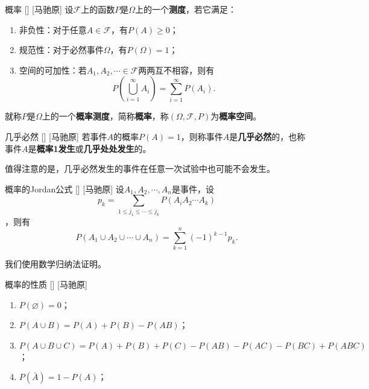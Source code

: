 \documentclass[UTF8]{ctexart}
\begin{document}
        \begin{dfn}
            []
            {概率}
            []
            [马驰原]
            设$\mathcal{F}$上的函数$P$是$\Omega$上的一个\textbf{测度}，若它满足：

            \begin{enumerate}
                \item 非负性：对于任意$A\in\mathcal{F}$，有$P(A)\geq 0$；
                \item 规范性：对于必然事件$\Omega$，有$P(\Omega)=1$；
                \item 空间的可加性：若$A_1,A_2,\cdots\in\mathcal{F}$两两互不相容，则有\[P\left(\bigcup_{i=1}^{\infty}A_i\right)=\sum_{i=1}^{\infty}P(A_i).\]
            \end{enumerate}
            就称$P$是$\Omega$上的一个\textbf{概率测度}，简称\textbf{概率}，称$(\Omega,\mathcal{F},P)$为\textbf{概率空间}。
        \end{dfn}

        \begin{dfn}
            []
            {几乎必然}
            []
            [马驰原]
            若事件$A$的概率$P(A)=1$，则称事件$A$是\textbf{几乎必然}的，也称事件$A$是\textbf{概率1发生}或\textbf{几乎处处发生}的。

            值得注意的是，几乎必然发生的事件在任意一次试验中也可能不会发生。
        \end{dfn}

        \begin{thm}
            []
            {概率的Jordan公式}
            []
            [马驰原]
            设$A_1,A_2,\cdots,A_n$是事件，设\[p_k=\sum_{1\leq j_1\leq\cdots\leq j_k  }P(A_iA_2\cdots A_k)\]，则有
            \[P(A_1\cup A_2\cup\cdots\cup A_n)=\sum_{k=1}^{n}(-1)^{k-1}p_k.\]
        \end{thm}

        \begin{prf}
            
            
            
            
            我们使用数学归纳法证明。


        \end{prf}

        \begin{ppt}
            []
            {概率的性质}
            []
            [马驰原]
            \begin{enumerate}
                \item $P(\varnothing)=0$；
                \item $P(A\cup B)=P(A)+P(B)-P(AB)$；
                \item $P(A\cup B\cup C)=P(A)+P(B)+P(C)-P(AB)-P(AC)-P(BC)+P(ABC)$；
                \item $P(\bar{A})=1-P(A)$；
            \end{enumerate}
        \end{ppt}
\end{document}
